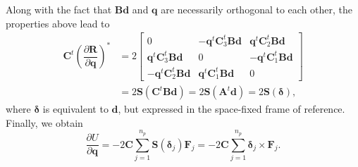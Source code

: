 \documentclass[aip,jcp,reprint,amsmath,amssymb,amsfont]{revtex4-1}
\newcommand{\mt}[1]{\boldsymbol{\mathbf{#1}}}           %
\newcommand{\vt}[1]{\boldsymbol{\mathbf{#1}}}           %
\newcommand{\tr}[1]{#1^t}                               %
\newcommand{\diff}[2]{\dfrac{\partial #1}{\partial #2}} %
\begin{document}
Along with the fact that $\mt B\vt d$ and $\vt q$ are necessarily orthogonal to each other, the properties above lead to
\begin{align*}
\tr{\mt C} \left( \diff{\vt R}{\vt q} \right)^\ast &= 2 \left[\begin{array}{ccc}
0 & -\tr{\vt q}\tr{\mt C}_3 \mt B \vt d & \tr{\vt q}\tr{\mt C}_2 \mt B \vt d \\
\tr{\vt q}\tr{\mt C}_3 \mt B \vt d & 0 & -\tr{\vt q}\tr{\mt C}_1 \mt B \vt d \\
-\tr{\vt q}\tr{\mt C}_2 \mt B \vt d & \tr{\vt q}\tr{\mt C}_1 \mt B \vt d & 0
\end{array}\right] \\
&= 2 \mt S(\tr{\mt C} \mt B \vt d) = 2 \mt S(\tr{\mt A}\vt d) = 2 \mt S(\vt \delta),
\end{align*}
where $\vt \delta$ is equivalent to $\vt d$, but expressed in the space-fixed frame of reference. Finally, we obtain
\[
\diff{U}{\vt q} = - 2 \mt C \sum_{j=1}^{n_p} \mt S(\vt \delta_j) {\vt F_j}  = - 2 \mt C \sum_{j=1}^{n_p} \vt \delta_j \times {\vt F_j}.
\]



\end{document}
